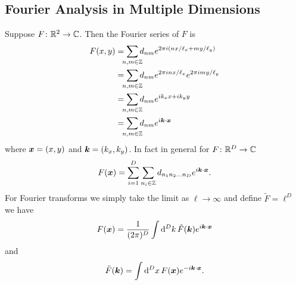 \documentclass[a4paper]{article}
\begin{document}
    \subsection{Fourier Analysis in Multiple Dimensions}
    Suppose \(F\colon\mathbb{R}^2\to\mathbb{C}\).
    Then the Fourier series of \(F\) is
    \begin{align*}
        F(x, y) &= \sum_{\mathclap{n, m\in\integers}} d_{nm}e^{2\pi i(nx/\ell_x + my/\ell_y)}\\
        &= \sum_{\mathclap{n, m\in\integers}} d_{nm}e^{2\pi inx/\ell_x}e^{2\pi imy/\ell_y}\\
        &= \sum_{\mathclap{n, m\in\integers}} d_{nm}e^{ik_xx + ik_yy}\\
        &= \sum_{\mathclap{n, m\in\integers}} d_{nm}e^{i\vv{k}\cdot\vv{x}} 
    \end{align*}
    where \(\bm{x} = (x, y)\) and \(\bm{k} = (k_x, k_y)\).
    In fact in general for \(F\colon\mathbb{R}^D\to\mathbb{C}\)
    \[F(\bm{x}) = \sum_{i = 1}^{D}\sum_{n_i\in\mathbb{Z}} d_{n_1n_2\dotso n_D} e^{i\bm{k}\cdot\bm{x}}.\]
    For Fourier transforms we simply take the limit as \(\ell \to\infty\) and define \(\tilde{F} = \ell^D\) we have
    \[F(\bm{x}) = \frac{1}{(2\pi)^D} \int \dd[D]{k}\tilde{F}(\bm{k})e^{i\bm{k}\cdot\bm{x}}\]
    and
    \[\tilde{F}(\bm{k}) = \int \dd[D]{x} F(\bm{x}) e^{-i\bm{k}\cdot\bm{x}}.\]
    
\end{document}
